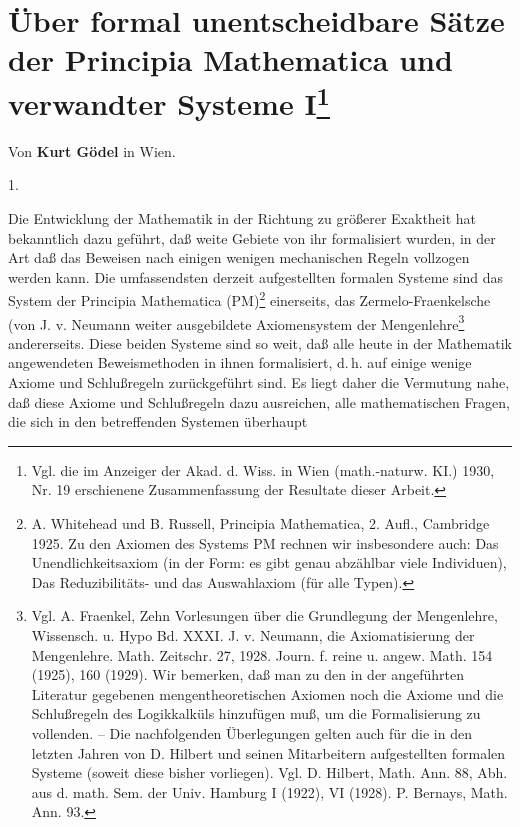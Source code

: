 \documentclass[draft]{scrartcl}
\begin{document}
\section{Über formal unentscheidbare Sätze der Principia Mathematica und verwandter Systeme I\protect\footnote{Vgl. die im Anzeiger der Akad. d. Wiss. in Wien (math.-naturw. KI.) 1930, Nr. 19 erschienene Zusammenfassung der Resultate dieser Arbeit.}}

\begin{center}
Von \textbf{Kurt Gödel} in Wien.
\end{center}

\begin{center}
1.
\end{center}

Die Entwicklung der Mathematik in der Richtung zu größerer
Exaktheit hat bekanntlich dazu geführt, daß weite Gebiete
von ihr formalisiert wurden, in der Art daß das Beweisen
nach einigen wenigen mechanischen Regeln vollzogen werden
kann. Die umfassendsten derzeit aufgestellten formalen 
Systeme sind das System der Principia Mathematica 
(PM)\footnote{A. Whitehead und B. Russell, Principia
Mathematica, 2. Aufl., Cambridge 1925. Zu den Axiomen 
des Systems PM rechnen wir insbesondere auch: 
Das Unendlichkeitsaxiom (in der Form: es gibt 
genau abzählbar viele Individuen), 
Das Reduzibilitäts- und das Auswahlaxiom (für alle 
Typen).} einerseits, das Zermelo-Fraenkelsche
(von J. v. Neumann weiter ausgebildete Axiomensystem
der Mengenlehre\footnote{Vgl. A. Fraenkel, Zehn
Vorlesungen über die Grundlegung der Mengenlehre,
Wissensch. u. Hypo Bd. XXXI. J. v. Neumann, die
Axiomatisierung der Mengenlehre. Math. Zeitschr. 27, 
1928. Journ. f. reine u. angew. Math. 154 (1925), 
160 (1929). Wir bemerken, daß man zu den in der
angeführten Literatur gegebenen mengentheoretischen
Axiomen noch die Axiome und die Schlußregeln des
Logikkalküls hinzufügen muß, um die Formalisierung 
zu vollenden. -- Die nachfolgenden Überlegungen gelten
auch für die in den letzten Jahren von D. Hilbert und
seinen Mitarbeitern aufgestellten formalen Systeme 
(soweit diese bisher vorliegen). Vgl. D. Hilbert,
Math. Ann. 88, Abh. aus d. math. Sem. der Univ. 
Hamburg I (1922), VI (1928). P. Bernays, Math. Ann. 93.} 
andererseits. Diese beiden Systeme sind so weit, daß 
alle heute in der Mathematik angewendeten 
Beweismethoden in ihnen formalisiert, d.\,h. auf
einige wenige Axiome und Schlußregeln zurückgeführt sind.
Es liegt daher die Vermutung nahe, daß diese Axiome
und Schlußregeln dazu ausreichen, alle mathematischen
Fragen, die sich in den betreffenden Systemen überhaupt
\end{document}
